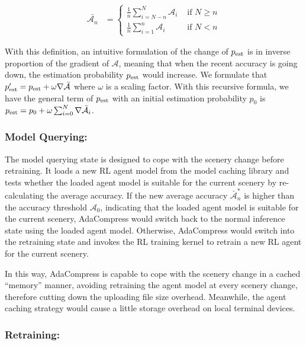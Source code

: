 \begin{align*}
\bar{\mathcal{A}_n} &=
\begin{cases}
\frac{1}{n}\sum_{i=N-n}^{N} \mathcal{A}_i & \text{ if } N \geq n \\ 
\frac{1}{n}\sum_{i=1}^{n} \mathcal{A}_i & \text{ if } N < n 
\end{cases}
\end{align*}

With this definition, an intuitive formulation of the change of $ p_{\rm est} $ is in inverse proportion of the gradient of $ \mathcal{A} $, meaning that when the recent accuracy is going down, the estimation probability $ p_{\rm est} $ would increase. We formulate that $ p'_{\rm est} = p_{\rm est} + \omega \nabla \bar{\mathcal{A}} $ where $ \omega $ is a scaling factor. With this recursive formula, we have the general term of $ p_{\rm est} $ with an initial estimation probability $ p_0 $ is $p_{\rm est} = p_0 + \omega \sum_{i=0}^{N} \nabla \bar{\mathcal{A}_i} $.

\subsubsection{\textbf{Model Querying:}}

The model querying state is designed to cope with the scenery change before retraining. It loads a new RL agent model from the model caching library and tests whether the loaded agent model is suitable for the current scenery by re-calculating the average accuracy. If the new average accuracy $ \bar{\mathcal{A}}^*_n $ is higher than the accuracy threshold $ \mathcal{A}_0 $, indicating that the loaded agent model is suitable for the current scenery, AdaCompress would switch back to the normal inference state using the loaded agent model. Otherwise, AdaCompress would switch into the retraining state and invokes the RL training kernel to retrain a new RL agent for the current scenery.

In this way, AdaCompress is capable to cope with the scenery change in a cached ``memory'' manner, avoiding retraining the agent model at every scenery change, therefore cutting down the uploading file size overhead. Meanwhile, the agent caching strategy would cause a little storage overhead on local terminal devices.


\subsubsection{\textbf{Retraining:}}

